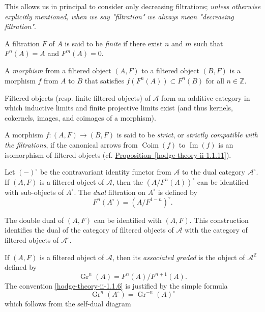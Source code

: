     This allows us in principal to consider only decreasing filtrations;
    \emph{unless otherwise explicitly mentioned, when we say "filtration" we always mean "decreasing filtration"}.\label{hodge-theory-ii-1.1.4}\par{}A filtration \(F\) of \(A\) is said to be \emph{finite} if there exist \(n\) and \(m\) such that \(F^n(A)=A\) and \(F^m(A)=0\).\label{hodge-theory-ii-1.1.5}\par{}A \emph{morphism} from a filtered object \((A,F)\) to a filtered object \((B,F)\) is a morphism \(f\) from \(A\) to \(B\) that satisfies \(f(F^n(A))\subset  F^n(B)\) for all \(n\in \mathbb {Z}\).\par{}Filtered objects (resp. finite filtered objects) of \(\mathscr {A}\) form an additive category in which inductive limits and finite projective limits exist (and thus kernels, cokernels, images, and coimages of a morphism).\par{}A morphism \(f\colon (A,F)\to (B,F)\) is said to be \emph{strict}, or \emph{strictly compatible with the filtrations}, if the canonical arrows from \(\operatorname {Coim}(f)\) to \(\operatorname {Im}(f)\) is an isomorphism of filtered objects (cf. \hyperref[hodge-theory-ii-1.1.11]{Proposition~\ref*{hodge-theory-ii-1.1.11}}).\label{hodge-theory-ii-1.1.6}\par{}Let \((-)^\circ \) be the contravariant identity functor from \(\mathscr {A}\) to the dual category \(\mathscr {A}^\circ \).
    If \((A,F)\) is a filtered object of \(\mathscr {A}\), then the \((A/F^n(A))^\circ \) can be identified with sub-objects of \(A^\circ \).
    The \emph{dual} filtration on \(A^\circ \) is defined by
    \[       F^n(A^\circ )       = (A/F^{1-n})^\circ .     \]\par{}The double dual of \((A,F)\) can be identified with \((A,F)\).
    This construction identifies the dual of the category of filtered objects of \(\mathscr {A}\) with the category of filtered objects of \(\mathscr {A}^\circ \).\label{hodge-theory-ii-1.1.7}\par{}If \((A,F)\) is a filtered object of \(\mathscr {A}\), then its \emph{associated graded} is the object of \(\mathscr {A}^\mathbb {Z}\) defined by
    \[       \operatorname {Gr}^n(A)       = F^n(A)/F^{n+1}(A).     \]
    The convention \cref{hodge-theory-ii-1.1.6} is justified by the simple formula
    \[       \operatorname {Gr}^n(A^\circ )       = \operatorname {Gr}^{-n}(A)^\circ      \]
    which follows from the self-dual diagram

